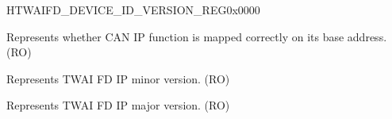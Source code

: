 \begin{register}{H}{TWAIFD\_DEVICE\_ID\_VERSION\_REG}{0x0000}\label{regdesc:TWAIFDDEVICEIDVERSIONREG}
%
%
%
\regnewline%
\begin{regdesc}\begin{reglist}
\label{fielddesc:TWAIFDDEVICEID}\item [TWAIFD\_DEVICE\_ID] Represents whether CAN IP function is mapped correctly on its base address. (RO)
\label{fielddesc:TWAIFDVERMINOR}\item [TWAIFD\_VER\_MINOR] Represents TWAI FD IP minor version. (RO)
\label{fielddesc:TWAIFDVERMAJOR}\item [TWAIFD\_VER\_MAJOR] Represents TWAI FD IP major version. (RO)
\end{reglist}\end{regdesc}
\end{register}


